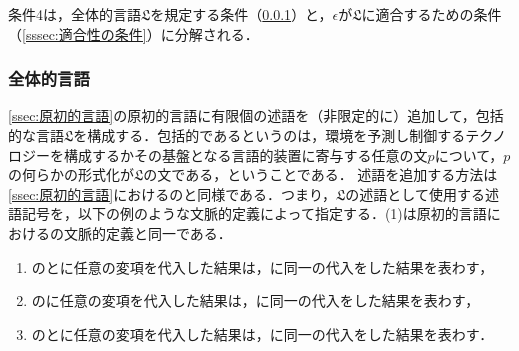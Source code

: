 条件4は，全体的言語$\mathfrak{L}$を規定する条件（\ref{sssec:全体的言語}）と，$\epsilon$が$\mathfrak{L}$に適合するための条件（\ref{sssec:適合性の条件}）に分解される．

\subsubsection{全体的言語}
\label{sssec:全体的言語}

\ref{ssec:原初的言語}の原初的言語に有限個の述語を（非限定的に）追加して，包括的な言語$\mathfrak{L}$を構成する．包括的であるというのは，環境を予測し制御するテクノロジーを構成するかその基盤となる言語的装置に寄与する任意の文$p$について，$p$の何らかの形式化が$\mathfrak{L}$の文である，ということである．
述語を追加する方法は\ref{ssec:原初的言語}におけるのと同様である．つまり，$\mathfrak{L}$の述語として使用する述語記号を，以下の例のような文脈的定義によって指定する．(1)は原初的言語における\kagi{$ \in $}の文脈的定義と同一である．
\begin{enumerate}[label=(\arabic*)]
    \item \kagi{$(\alpha\in\beta)$}の\kagi{$\alpha$}と\kagi{$\beta$}に任意の変項を代入した結果は，に同一の代入をした結果を表わす，
    \item {}の\kagi{$\alpha$}に任意の変項を代入した結果は，に同一の代入をした結果を表わす，
    \item {}の\kagi{$\alpha$}と\kagi{$\beta$}に任意の変項を代入した結果は，に同一の代入をした結果を表わす．
\end{enumerate}

